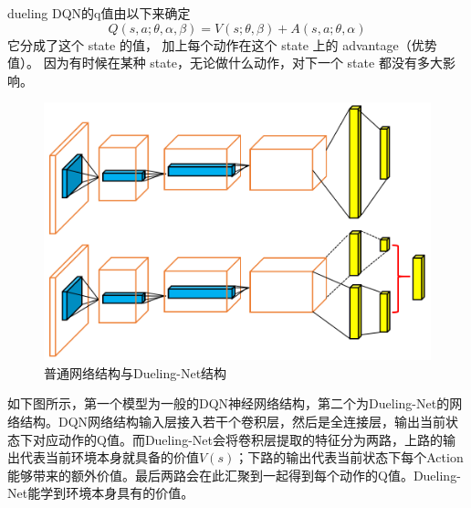 dueling DQN的q值由以下来确定
\begin{equation}
  Q(s, a ; \theta, \alpha, \beta)=V(s ; \theta, \beta)+A(s, a ; \theta, \alpha)
\end{equation}
它分成了这个 state 的值， 加上每个动作在这个 state 上的 advantage（优势值）。 因为有时候在某种 state，无论做什么动作，对下一个 state 都没有多大影响。
\begin{figure}[h]
  \centering
  \label{fig:dueling}
  \includegraphics[scale=0.5]{static/dueling.png}
  \caption{普通网络结构与Dueling-Net结构}
\end{figure}

如下图所示，第一个模型为一般的DQN神经网络结构，第二个为Dueling-Net的网络结构。DQN网络结构输入层接入若干个卷积层，然后是全连接层，输出当前状态下对应动作的Q值。而Dueling-Net会将卷积层提取的特征分为两路，上路的输出代表当前环境本身就具备的价值$V(s)$；下路的输出代表当前状态下每个Action能够带来的额外价值。最后两路会在此汇聚到一起得到每个动作的Q值。Dueling-Net能学到环境本身具有的价值。